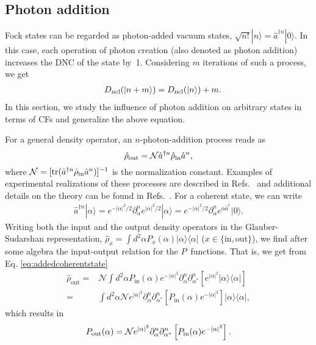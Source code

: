 \documentclass[aps,pra,twocolumn,showpacs,superscriptaddress,10pt]{revtex4-1}
\begin{document}
\subsection{Photon addition}\label{sec:PhAdd}
	Fock states can be regarded as photon-added vacuum states, $\sqrt{n!}|n\rangle=\hat a^{\dag n}|0\rangle$.
	In this case, each operation of photon creation (also denoted as photon addition) increases the DNC of the state by~1.
	Considering $m$ iterations of such a process, we get
	\begin{eqnarray}
		&&D_{\rm ncl}(|n+m\rangle)=D_{\rm ncl}(|n\rangle)+m.
	\end{eqnarray}
	In this section, we study the influence of photon addition on arbitrary states in terms of CFs and generalize the above equation.

	For a general density operator, an $n$-photon-addition process reads as
	\begin{equation}\label{eq:multiadd}
		\hat{\rho}_{\rm out}=\mathcal{N}\hat{a}^{\dag n}\hat{\rho}_{\rm in}\hat{a}^n,
	\end{equation}
	where $\mathcal{N}=[{\rm tr}(\hat{a}^{\dag n}\hat{\rho}_{\rm in}\hat{a}^n)]^{-1}$ is the normalization constant.
	Examples of experimental realizations of these processes are described in Refs.~\cite{Bellini2007,Zavatta2007,Kiesel2008} and additional details on the theory can be found in Refs.~\cite{Rahimi2013,Fiurasek2009,Dodonov2009,Sperling2014}.
	For a coherent state, we can write
	\begin{align}\label{eq:addedcoherentstate}
		\hat a^{\dag n}|\alpha\rangle=e^{-|\alpha|^2/2}\partial_\alpha^n e^{|\alpha|^2/2}|\alpha\rangle=e^{-|\alpha|^2/2}\partial_\alpha^n e^{\alpha\hat a^\dag}|0\rangle.
	\end{align}
	Writing both the input and the output density operators in the Glauber-Sudarshan representation,
	$\hat\rho_x=\int d^2\alpha P_x(\alpha)|\alpha\rangle\langle\alpha|$ ($x\in\{\mathrm{in},\mathrm{out}\}$),
	we find after some algebra the input-output relation for the $P$~functions.
	That is, we get from Eq. \eqref{eq:addedcoherentstate}
	\begin{align}\nonumber
		\hat\rho_\mathrm{out}=&\mathcal N\int d^2\alpha P_\mathrm{in}(\alpha)e^{-|\alpha|^2}\partial_\alpha^n\partial_{\alpha^\ast}^n\left[e^{|\alpha|^2}|\alpha\rangle\langle\alpha|\right]
		\\=&\int d^2\alpha \mathcal N e^{|\alpha|^2}\partial_\alpha^n\partial_{\alpha^\ast}^n\left[P_\mathrm{in}(\alpha)e^{-|\alpha|^2}\right]|\alpha\rangle\langle\alpha|,
	\end{align}
	which results in
	\begin{equation}
		P_{\rm out}(\alpha)=\mathcal{N}e^{|\alpha|^2}\partial_{\alpha}^n\partial_{\alpha^{\ast}}^n\left[ P_{\rm in}(\alpha)e^{-|\alpha|^2}\right].
	\end{equation}
	
\end{document}
